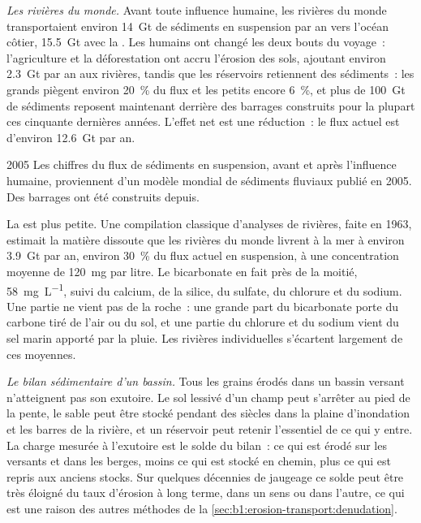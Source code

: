 \emph{Les rivières du monde.} Avant toute influence humaine, les rivières du monde
transportaient environ \qty{14}{Gt} de sédiments en suspension par an vers l'océan
côtier, \qty{15.5}{Gt} avec la . Les humains ont changé les deux bouts du
voyage~: l'agriculture et la déforestation ont accru l'érosion des sols, ajoutant environ
\qty{2.3}{Gt} par an aux rivières, tandis que les réservoirs retiennent des sédiments~: les
grands piègent environ \qty{20}{\percent} du flux et les petits encore
\qty{6}{\percent}, et plus de \qty{100}{Gt} de sédiments reposent maintenant derrière des
barrages construits pour la plupart ces cinquante dernières années. L'effet net est une réduction~: le
flux actuel est d'environ \qty{12.6}{Gt} par an.

\begin{dated}{2005}
Les chiffres du flux de sédiments en suspension, avant et après l'influence humaine,
proviennent d'un modèle mondial de sédiments fluviaux publié en 2005. Des barrages ont été
construits depuis.
\end{dated}

La  est plus petite. Une compilation classique d'analyses de rivières, faite en
1963, estimait la matière dissoute que les rivières du monde livrent à la mer
à environ \qty{3.9}{Gt} par an, environ \qty{30}{\percent} du flux actuel en suspension,
à une concentration moyenne de \qty{120}{mg} par litre. Le bicarbonate en fait
près de la moitié, \qty{58}{mg.L^{-1}}, suivi du calcium, de la silice, du sulfate,
du chlorure et du sodium. Une partie ne vient pas de la roche~: une grande part du
bicarbonate porte du carbone tiré de l'air ou du sol, et une partie du
chlorure et du sodium vient du sel marin apporté par la pluie. Les rivières individuelles
s'écartent largement de ces moyennes.

\emph{Le bilan sédimentaire d'un bassin.} Tous les grains érodés dans un bassin versant
n'atteignent pas son exutoire. Le sol lessivé d'un champ peut s'arrêter au pied de la
pente, le sable peut être stocké pendant des siècles dans la plaine d'inondation et les barres de la rivière,
et un réservoir peut retenir l'essentiel de ce qui y entre. La charge mesurée à
l'exutoire est le solde du bilan~: ce qui est érodé sur les versants et dans les
berges, moins ce qui est stocké en chemin, plus ce qui est repris aux anciens
stocks. Sur quelques décennies de jaugeage ce solde peut être très éloigné du
taux d'érosion à long terme, dans un sens ou dans l'autre, ce qui est une raison des
autres méthodes de la \cref{sec:b1:erosion-transport:denudation}.

